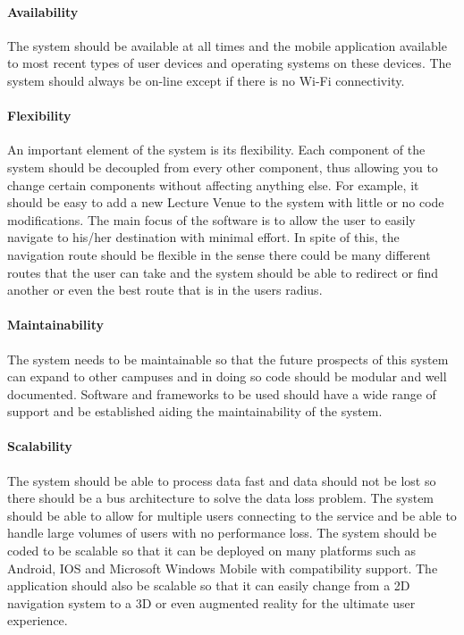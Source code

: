 \documentclass[runningheads,a4paper]{article}
\begin{document}
\paragraph{\textbf{Availability} \\}
 The system should be available at all times and the mobile application available to most recent types of user devices and operating systems on these devices. The system should always be on-line except if there is no Wi-Fi connectivity.

\paragraph{\textbf{Flexibility} \\}
 An important element of the system is its flexibility. 
 Each component of the system should be decoupled from every other component, thus allowing you to change certain components without affecting anything else. 
 For example, it should be easy to add a new Lecture Venue to the system with little or no code modifications. 
 The main focus of the software is to allow the user to easily navigate to his/her destination with minimal effort.
 In spite of this, the navigation route should be flexible in the sense there could be many different routes that the user can take and the system should be able to redirect or find another or even the best route that is in the users radius.

\paragraph{\textbf{Maintainability} \\}
 The system needs to be maintainable so that the future prospects of this system can expand to other campuses and in doing so code should be modular and well documented. Software and frameworks to be used should have a wide range of support and be established aiding the maintainability of the system.

\paragraph{\textbf{Scalability} \\}
 The system should be able to process data fast and data should not be lost so there should be a bus architecture to solve the data loss problem. The system should be able to allow for multiple users connecting to the service and be able to handle large volumes of users with no performance loss. The system should be coded to be scalable so that it can be deployed on many platforms such as Android, IOS and Microsoft Windows Mobile with compatibility support. The application should also be scalable so that it can easily change from a 2D navigation system to a 3D or even augmented reality for the ultimate user experience.
\end{document}
